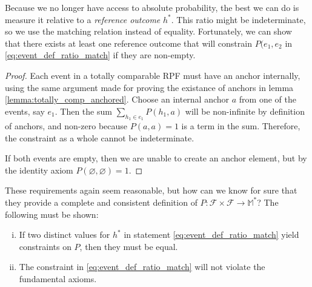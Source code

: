 \documentclass[twoside]{article}
\theoremstyle{plain}%
\theoremstyle{definition}
\theoremstyle{remark}
\begin{document}
Because we no longer have access to absolute probability, the best we can do is measure it relative to a \textit{reference outcome} \(h^*\). This ratio might be indeterminate, so we use the matching relation instead of equality. Fortunately, we can show that there exists at least one reference outcome that will constrain \(P(e_1, e_2\) in \ref{eq:event_def_ratio_match} if they are non-empty.

\begin{proof}
Each event in a totally comparable RPF must have an anchor internally, using the same argument made for proving the existance of anchors in lemma \ref{lemma:totally_comp_anchored}. Choose an internal anchor \(a\) from one of the events, say \(e_1\). Then the sum \(\sum_{h_1 \in e_1} P(h_1, a)\) will be non-infinite by definition of anchors, and non-zero because \(P(a, a) = 1\) is a term in the sum. Therefore, the constraint as a whole cannot be indeterminate.

If both events are empty, then we are unable to create an anchor element, but by the identity axiom \(P(\varnothing, \varnothing) = 1\).
\end{proof}

These requirements again seem reasonable, but how can we know for sure that they provide a complete and consistent definition of \(P: \mathcal{F} \times \mathcal{F} \rightarrow \mathbb{M}^*\)? The following must be shown:

\begin{enumerate}[(i)]
  \item \label{event_def_proof_1} If two distinct values for \(h^*\) in statement \ref{eq:event_def_ratio_match} yield constraints on \(P\), then they must be equal.
  \item \label{event_def_proof_2} The constraint in \ref{eq:event_def_ratio_match} will not violate the fundamental axioms.
\end{enumerate}
\end{document}
